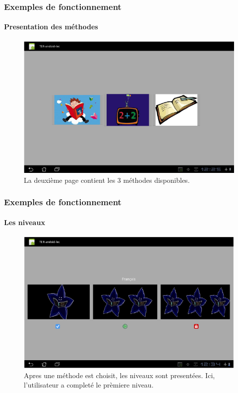 \documentclass[15pt]{beamer}
\begin{document}
\begin{frame}
 \frametitle{Exemples de fonctionnement}
  \framesubtitle{Presentation des m\'ethodes}
\begin{figure}[tr]
  \centering
  \includegraphics[scale=0.50]{./methods.png}
  \caption{La deuxi\`eme page contient les 3 m\'ethodes disponibles.}
  \label{fig:figure1}
\end{figure}
\end{frame}

\begin{frame}
 \frametitle{Exemples de fonctionnement}
  \framesubtitle{Les niveaux}
\begin{figure}[tr]
  \centering
  \includegraphics[scale=0.50]{./levels.png}
  \caption{Apres une m\'ethode est choisit, les niveaux sont present\'ees. Ici, l'utilisateur a complet\'e le pr\`emiere niveau.}
  \label{fig:figure1}
\end{figure}
\end{frame}
\end{document}
